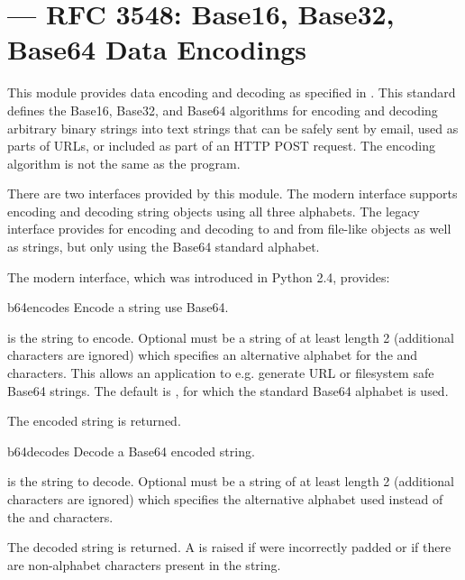 \section{ ---
	 RFC 3548: Base16, Base32, Base64 Data Encodings}




This module provides data encoding and decoding as specified in
.  This standard defines the Base16, Base32, and Base64
algorithms for encoding and decoding arbitrary binary strings into
text strings that can be safely sent by email, used as parts of URLs,
or included as part of an HTTP POST request.  The encoding algorithm is
not the same as the  program.

There are two interfaces provided by this module.  The modern
interface supports encoding and decoding string objects using all
three alphabets.  The legacy interface provides for encoding and
decoding to and from file-like objects as well as strings, but only
using the Base64 standard alphabet.

The modern interface, which was introduced in Python 2.4, provides:

\begin{funcdesc}{b64encode}{s}
Encode a string use Base64.

 is the string to encode.  Optional  must be a
string of at least length 2 (additional characters are ignored) which
specifies an alternative alphabet for the \code{+} and \code{/}
characters.  This allows an application to e.g. generate URL or
filesystem safe Base64 strings.  The default is , for which
the standard Base64 alphabet is used.

The encoded string is returned.
\end{funcdesc}

\begin{funcdesc}{b64decode}{s}
Decode a Base64 encoded string.

 is the string to decode.  Optional  must be a
string of at least length 2 (additional characters are ignored) which
specifies the alternative alphabet used instead of the \code{+} and
\code{/} characters.

The decoded string is returned.  A  is raised if
 were incorrectly padded or if there are non-alphabet
characters present in the string.
\end{funcdesc}

